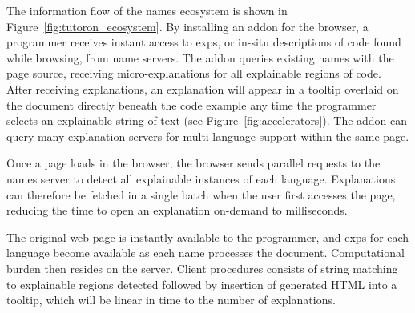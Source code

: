 The information flow of the \Glspl{name} ecosystem is shown in Figure~\ref{fig:tutoron_ecosystem}.
By installing an addon for the browser, a programmer receives instant access to \glspl{exp}, or in-situ descriptions of code found while browsing, from \Gls{name} servers.
The addon queries existing \Glspl{name} with the page source, receiving micro-explanations for all explainable regions of code.
After receiving explanations, an explanation will appear in a tooltip overlaid on the document directly beneath the code example any time the programmer selects an explainable string of text (see Figure~\ref{fig:accelerators}). 
The addon can query many explanation servers for multi-language support within the same page.


\begin{changes}
Once a page loads in the browser, the browser sends parallel requests to the \Glspl{name} server to detect all explainable instances of each language.
Explanations can therefore be fetched in a single batch when the user first accesses the page, reducing the time to open an explanation on-demand to milliseconds.
\end{changes}
The original web page is instantly available to the programmer, and \glspl{exp} for each language become available as each \Gls{name} processes the document.
Computational burden then resides on the server.
 Client procedures consists of string matching to explainable regions detected followed by insertion of generated HTML into a tooltip, which will be linear in time to the number of explanations.\fi


